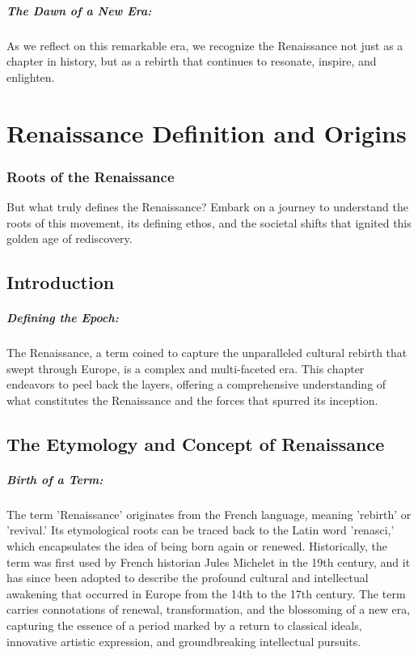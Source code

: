 \documentclass[a4paper,12pt]{book}
\begin{document}
\paragraph{The Dawn of a New Era:}
As we reflect on this remarkable era, we recognize the Renaissance not just as a chapter in history, but as a rebirth that continues to resonate, inspire, and enlighten.

\chapter{Renaissance Definition and Origins}
\subsection*{Roots of the Renaissance}
But what truly defines the Renaissance? Embark on a journey to understand the roots of this movement, its defining ethos, and the societal shifts that ignited this golden age of rediscovery.

\section*{Introduction}

\paragraph{Defining the Epoch:}
The Renaissance, a term coined to capture the unparalleled cultural rebirth that swept through Europe, is a complex and multi-faceted era. This chapter endeavors to peel back the layers, offering a comprehensive understanding of what constitutes the Renaissance and the forces that spurred its inception.

\section*{The Etymology and Concept of Renaissance}

\paragraph{Birth of a Term:}
The term 'Renaissance' originates from the French language, meaning 'rebirth' or 'revival.' Its etymological roots can be traced back to the Latin word 'renasci,' which encapsulates the idea of being born again or renewed. Historically, the term was first used by French historian Jules Michelet in the 19th century, and it has since been adopted to describe the profound cultural and intellectual awakening that occurred in Europe from the 14th to the 17th century. The term carries connotations of renewal, transformation, and the blossoming of a new era, capturing the essence of a period marked by a return to classical ideals, innovative artistic expression, and groundbreaking intellectual pursuits.
\end{document}
